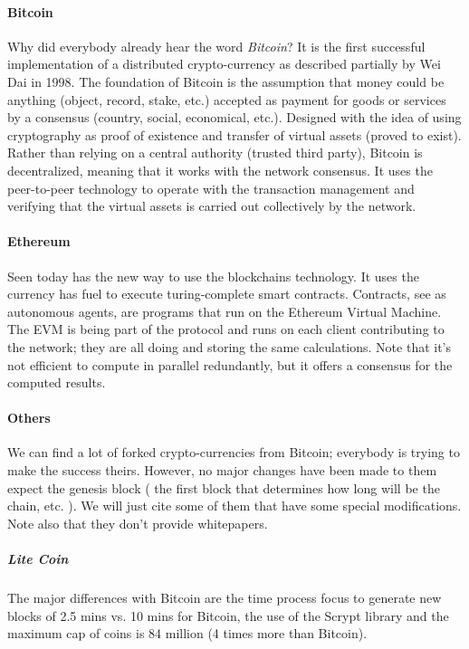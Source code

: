 \paragraph{Bitcoin \cite{SatoshiNakamoto2008Bitcoin:System}}
Why did everybody already hear the word \textit{Bitcoin}? It is the first successful implementation of a distributed crypto-currency as described partially by Wei Dai in 1998\cite{Wei1998B-Money}. The foundation of Bitcoin is the assumption that money could be anything (object, record, stake, etc.) accepted as payment for goods or services by a consensus (country, social, economical, etc.).
Designed with the idea of using cryptography as proof of existence and transfer of virtual assets (proved to exist). Rather than relying on a central authority (trusted third party), Bitcoin is decentralized, meaning that it works with the network consensus. It uses the peer-to-peer technology to operate with the transaction management and verifying that the virtual assets is carried out collectively by the network.

\paragraph{Ethereum \cite{Ethereum2016EthereumDocumentation}}
Seen today has the new way to use the blockchains technology. It uses the currency has fuel to execute turing-complete smart contracts. Contracts, see as autonomous agents, are programs that run on the Ethereum Virtual Machine. The EVM is being part of the protocol and runs on each client contributing to the network; they are all doing and storing the same calculations. Note that it's not efficient to compute in parallel redundantly, but it offers a consensus for the computed results. 

\paragraph{Others}
We can find a lot of forked crypto-currencies from Bitcoin; everybody is trying to make the success theirs. However, no major changes have been made to them expect the genesis block ( the first block that determines how long will be the chain, etc. ). We will just cite some of them that have some special modifications. Note also that they don't provide whitepapers.

\subparagraph{Lite Coin\cite{Litecoin2011LitecoinWiki}}
The major differences with Bitcoin are the time process focus to generate new blocks of 2.5 mins vs. 10 mins for Bitcoin, the use of the Scrypt\cite{COLINPERCIVAL2012STRONGERFUNCTIONS} library and the maximum cap of coins is 84 million (4 times more than Bitcoin).

